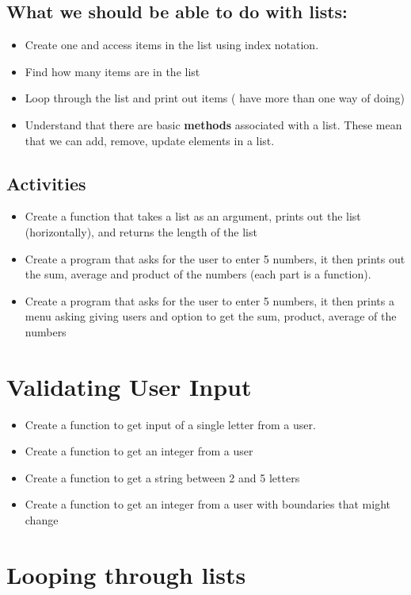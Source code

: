 \documentclass[a4paper,12pt]{article}
\begin{document}
\subsection{What we should be able to do with lists:}
\begin{itemize}
	\item Create one and access items in the list using index notation.
	\item Find how many items are in the list
	\item Loop through the list and print out items ( have more than one way of doing)
	\item Understand that there are basic \textbf{methods} associated with a list. These mean that we can add, remove, update elements in a list.
\end{itemize}
\subsection{Activities}
\begin{itemize}
	\item Create a function that takes a list as an argument, prints out the list (horizontally), and returns the length of the list
	\item Create a program that asks for the user to enter 5 numbers, it then prints out the sum, average  and product of the numbers (each part is a function).
	\item Create a program that asks for the user to enter 5 numbers, it then prints a menu asking giving users and option to get the sum, product, average of the numbers
\end{itemize}
\section{Validating User Input}
\begin{itemize}
\item Create a function to get input of a single letter from a user.
\item  Create a function to get an integer from a user
\item Create a function to get a string between 2 and 5 letters
\item Create a function to get an integer from a user with boundaries that might change
\end{itemize}
\section{Looping through lists}
\newpage
	\hypertarget{Lists}{}




\end{document}
